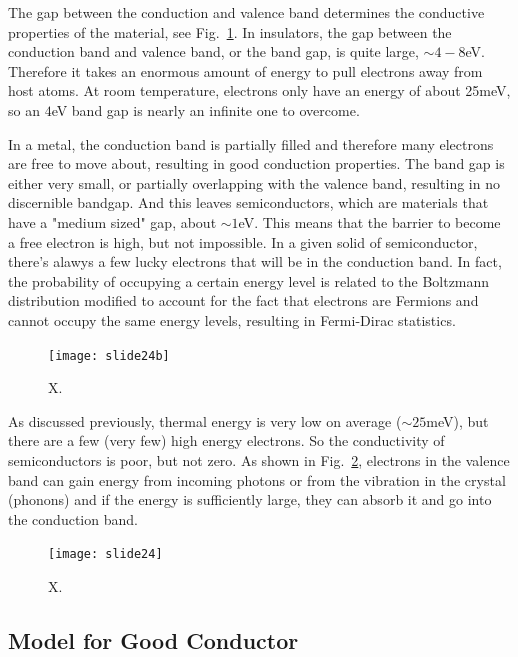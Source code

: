 The gap between the conduction and valence band determines the conductive properties of the material, see Fig.~\ref{fig:slide24b}.  In insulators, the gap between the conduction band and  valence band, or the band gap, is quite large,  $\sim 4-8$eV.  Therefore it takes an enormous amount of energy to pull electrons away from host atoms.  At room temperature, electrons only have an energy of about 25meV, so an $4$eV band gap is nearly an infinite one to overcome.  

In a metal, the conduction band is partially filled and therefore many electrons are free to move about, resulting in good conduction properties.  The band gap is either very small, or partially overlapping with the valence band, resulting in no discernible bandgap.  And this leaves semiconductors, which are materials that have a "medium sized" gap, about $\sim 1$eV.  This means that the barrier to become a free electron is high, but not impossible.  In a given solid of semiconductor, there's alawys a few lucky electrons that will be in the conduction band.  In fact, the probability of occupying  a certain energy level is related to the Boltzmann distribution modified to account for the fact that electrons are Fermions and cannot occupy the same energy levels, resulting in Fermi-Dirac statistics.


\begin{figure}
\begin{center}
\texttt{[image: slide24b]}
\end{center}
\caption{X. } \label{fig:slide24b}
\end{figure}

As discussed previously, thermal energy is very low on average ($\sim 25$meV), but there are a few (very few) high energy electrons.   So the conductivity of semiconductors is poor, but not zero.  As shown in Fig.~\ref{fig:slide24}, electrons in the valence band can gain energy from incoming photons or from the vibration in the crystal (phonons) and if the energy is sufficiently large, they can absorb  it and go into the conduction band.


\begin{figure}
\begin{center}
\texttt{[image: slide24]}
\end{center}
\caption{X. } \label{fig:slide24}
\end{figure}


\subsection{Model for Good Conductor}
  
